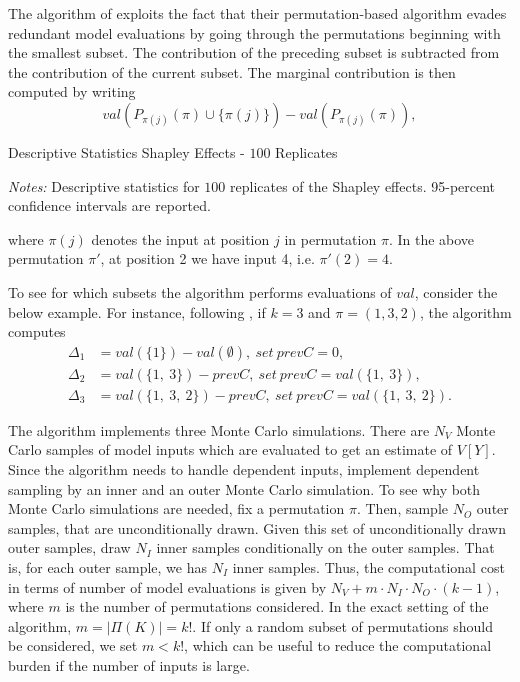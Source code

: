 The algorithm of \citet{SNS16} exploits the fact that their permutation-based algorithm evades redundant model evaluations by going through the permutations beginning with the smallest subset. The contribution of the preceding subset is subtracted from the contribution of the current subset. The marginal contribution is then computed by writing
\begin{equation*}
val(P_{\pi(j)}(\pi) \cup \{\pi(j)\}) - val(P_{\pi(j)}(\pi)),
\end{equation*}

\begin{table}[t]
	\centering
	\caption{Descriptive Statistics Shapley Effects - $100$ Replicates}
	\label{shapley_descriptives}
	\begin{threeparttable}
	\centering
	
	\begin{tablenotes}
	\small
	\item \textit{Notes:} Descriptive statistics for $100$ replicates of the Shapley effects. 95-percent confidence intervals are reported.
	\end{tablenotes}
	\end{threeparttable}
\end{table}

\noindent where $\pi(j)$ denotes the input at position $j$ in permutation $\pi$. In the above permutation $\pi'$, at position 2 we have input 4, i.e. $\pi'(2)=4$.

To see for which subsets the algorithm performs evaluations of $val$, consider the below example. For instance, following \citet{SNS16}, if $k=3$ and $\pi=(1, 3, 2)$, the algorithm computes
\begin{align*}
\Delta_1 &=val(\{1\})-val(\emptyset),\ set\ prevC=0, \\
\Delta_2 &=val(\{1,\ 3\})-prevC,\ set\ prevC=val(\{1,\ 3\}), \\
\Delta_3 &=val(\{1,\ 3,\ 2\})-prevC,\ set\ prevC=val(\{1,\ 3,\ 2\}).
\end{align*}

The algorithm implements three Monte Carlo simulations. There are $N_V$ Monte Carlo samples of model inputs which are evaluated to get an estimate of $V[Y]$. Since the algorithm needs to handle dependent inputs, \citet{SNS16} implement dependent sampling by an inner and an outer Monte Carlo simulation. To see why both Monte Carlo simulations are needed, fix a permutation $\pi$. Then, sample $N_O$ outer samples, that are unconditionally drawn. Given this set of unconditionally drawn outer samples, draw $N_I$ inner samples conditionally on the outer samples. That is, for each outer sample, we has $N_I$ inner samples. Thus, the computational cost in terms of number of model evaluations is given by $N_V+m \cdot N_I \cdot N_O \cdot (k-1)$, where $m$ is the number of permutations considered. In the exact setting of the algorithm, $m=\vert \Pi(K) \vert=k!$. If only a random subset of permutations should be considered, we set $m<k!$, which can be useful to reduce the computational burden if the number of inputs is large.

